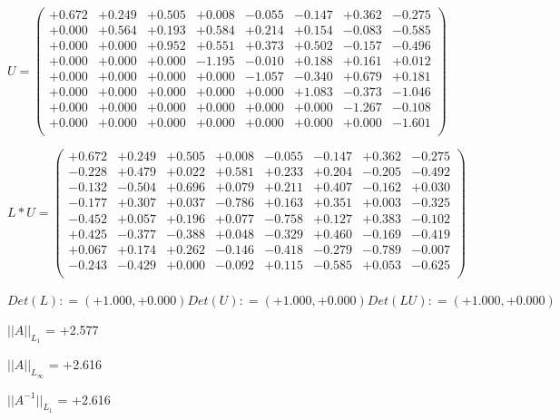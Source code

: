 \documentclass[9pt]{article}
\theoremstyle{plain}
\theoremstyle{definition}
\theoremstyle{remark}
\numberwithin{equation}{section}
\begin{document}
$U = \left(
\begin{array}{
cccccccc}
+0.672 & +0.249 & +0.505 & +0.008 & -0.055 & -0.147 & +0.362 & -0.275 \\
+0.000 & +0.564 & +0.193 & +0.584 & +0.214 & +0.154 & -0.083 & -0.585 \\
+0.000 & +0.000 & +0.952 & +0.551 & +0.373 & +0.502 & -0.157 & -0.496 \\
+0.000 & +0.000 & +0.000 & -1.195 & -0.010 & +0.188 & +0.161 & +0.012 \\
+0.000 & +0.000 & +0.000 & +0.000 & -1.057 & -0.340 & +0.679 & +0.181 \\
+0.000 & +0.000 & +0.000 & +0.000 & +0.000 & +1.083 & -0.373 & -1.046 \\
+0.000 & +0.000 & +0.000 & +0.000 & +0.000 & +0.000 & -1.267 & -0.108 \\
+0.000 & +0.000 & +0.000 & +0.000 & +0.000 & +0.000 & +0.000 & -1.601 \\
\end{array}
\right)$ \newline 

$L * U  = \left(
\begin{array}{
cccccccc}
+0.672 & +0.249 & +0.505 & +0.008 & -0.055 & -0.147 & +0.362 & -0.275 \\
-0.228 & +0.479 & +0.022 & +0.581 & +0.233 & +0.204 & -0.205 & -0.492 \\
-0.132 & -0.504 & +0.696 & +0.079 & +0.211 & +0.407 & -0.162 & +0.030 \\
-0.177 & +0.307 & +0.037 & -0.786 & +0.163 & +0.351 & +0.003 & -0.325 \\
-0.452 & +0.057 & +0.196 & +0.077 & -0.758 & +0.127 & +0.383 & -0.102 \\
+0.425 & -0.377 & -0.388 & +0.048 & -0.329 & +0.460 & -0.169 & -0.419 \\
+0.067 & +0.174 & +0.262 & -0.146 & -0.418 & -0.279 & -0.789 & -0.007 \\
-0.243 & -0.429 & +0.000 & -0.092 & +0.115 & -0.585 & +0.053 & -0.625 \\
\end{array}
\right)$ \newline 

$Det(L) :    = (+1.000,+0.000)     Det(U) :    = (+1.000,+0.000)     Det(LU) :    = (+1.000,+0.000)$

$||A||_{L_1}$  = +2.577

$||A||_{L_{\infty}}$ = +2.616

$||A^{-1}||_{L_1}$  = +2.616
\end{document}
